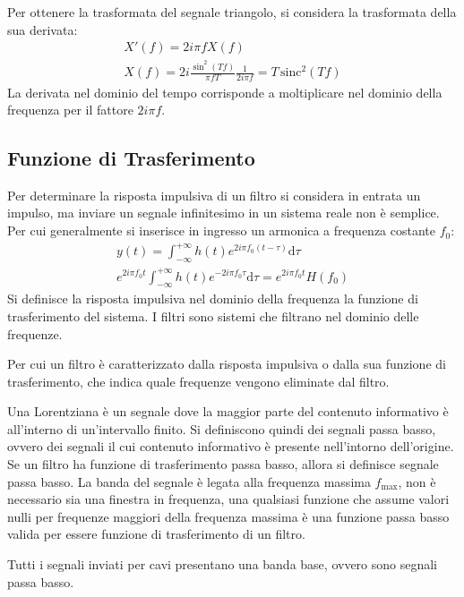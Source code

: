 \documentclass{article}
\newcommand{\sinc}{\mathrm{sinc}}
\newcommand{\df}{\mathrm{d}}
\numberwithin{equation}{subsection}
\begin{document}
Per ottenere la trasformata del segnale triangolo, si considera la trasformata della sua derivata:
\begin{gather*}
    X'(f)=2i\pi fX(f)\\
    X(f)=\displaystyle2i\frac{\sin^2(Tf)}{\pi fT}\frac{1}{2i\pi f}=T\,\sinc^2(Tf)
\end{gather*}
La derivata nel dominio del tempo corrisponde a moltiplicare nel dominio della frequenza per il fattore $2i\pi f$. 

\subsection{Funzione di Trasferimento}

Per determinare la risposta impulsiva di un filtro si considera in entrata un impulso, ma inviare un segnale infinitesimo in un sistema reale non è semplice. Per cui generalmente 
si inserisce in ingresso un armonica a frequenza costante $f_0$:
\begin{gather*}
    y(t)=\displaystyle\int_{-\infty}^{+\infty}h(t)e^{2i\pi f_0(t-\tau)}\df\tau\\
    e^{2i\pi f_0t}\displaystyle\int_{-\infty}^{+\infty}h(t)e^{-2i\pi f_0\tau}\df\tau=e^{2i\pi f_0t}H(f_0)
\end{gather*}
Si definisce la risposta impulsiva nel dominio della frequenza la funzione di trasferimento del sistema. I filtri sono sistemi che filtrano nel dominio delle frequenze. 

Per cui un filtro è caratterizzato dalla risposta impulsiva o dalla sua funzione di trasferimento, che indica quale frequenze vengono eliminate dal filtro. 




Una Lorentziana è un segnale dove la maggior parte del contenuto informativo è all'interno di un'intervallo finito. Si definiscono quindi dei segnali passa basso, 
ovvero dei segnali il cui contenuto informativo è presente nell'intorno dell'origine. Se un filtro ha funzione di trasferimento passa basso, allora si definisce segnale 
passa basso. La banda del segnale è legata alla frequenza massima $f_{\max}$, non è necessario sia una finestra in frequenza, una qualsiasi funzione che assume valori nulli 
per frequenze maggiori della frequenza massima è una funzione passa basso valida per essere funzione di trasferimento di un filtro. 

Tutti i segnali inviati per cavi presentano una banda base, ovvero sono segnali passa basso. 
\end{document}
